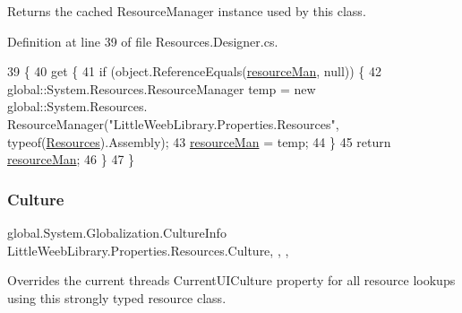 Returns the cached Resource\+Manager instance used by this class. 



Definition at line 39 of file Resources.\+Designer.\+cs.


\begin{DoxyCode}
39                                                                                \{
40             \textcolor{keyword}{get} \{
41                 \textcolor{keywordflow}{if} (\textcolor{keywordtype}{object}.ReferenceEquals(\mbox{\hyperlink{class_little_weeb_library_1_1_properties_1_1_resources_a6d062a13ce609e908f117f76256a39f8}{resourceMan}}, null)) \{
42                     global::System.Resources.ResourceManager temp = \textcolor{keyword}{new} global::System.Resources.
      ResourceManager(\textcolor{stringliteral}{"LittleWeebLibrary.Properties.Resources"}, typeof(\mbox{\hyperlink{class_little_weeb_library_1_1_properties_1_1_resources_ae0439f3d53efcbb58f6259478db62e9e}{Resources}}).Assembly);
43                     \mbox{\hyperlink{class_little_weeb_library_1_1_properties_1_1_resources_a6d062a13ce609e908f117f76256a39f8}{resourceMan}} = temp;
44                 \}
45                 \textcolor{keywordflow}{return} \mbox{\hyperlink{class_little_weeb_library_1_1_properties_1_1_resources_a6d062a13ce609e908f117f76256a39f8}{resourceMan}};
46             \}
47         \}
\end{DoxyCode}
\mbox{\label{class_little_weeb_library_1_1_properties_1_1_resources_a58ffc26a2061c9892ae606c75696b5ae}} 
\subsubsection{\texorpdfstring{Culture}{Culture}}
{\footnotesize\ttfamily global.\+System.\+Globalization.\+Culture\+Info Little\+Weeb\+Library.\+Properties.\+Resources.\+Culture\hspace{0.3cm}{\ttfamily [static]}, {\ttfamily [get]}, {\ttfamily [set]}, {\ttfamily [package]}}



Overrides the current thread\textquotesingle{}s Current\+U\+I\+Culture property for all resource lookups using this strongly typed resource class. 



